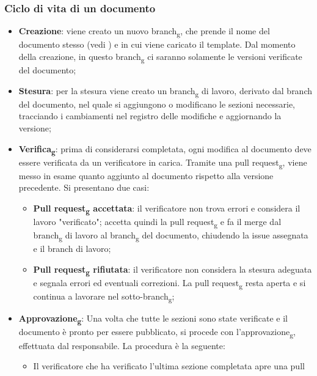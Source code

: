 \subsubsection{Ciclo di vita di un documento}
\begin{itemize}
      \item \textbf{Creazione}: viene creato un nuovo branch\textsubscript{g}, che prende il nome del documento stesso
            (vedi ) e in cui viene caricato il template. Dal momento della creazione, in questo
            branch\textsubscript{g} ci saranno solamente le versioni verificate del documento;
      \item \textbf{Stesura}: per la stesura viene creato un branch\textsubscript{g} di lavoro, derivato dal branch del documento, nel quale si aggiungono o modificano le
            sezioni necessarie, tracciando i cambiamenti nel registro delle modifiche e aggiornando la versione;
      \item \textbf{Verifica\textsubscript{g}}: prima di considerarsi completata, ogni modifica al documento deve essere verificata da un verificatore in carica.
            Tramite una pull request\textsubscript{g}, viene messo in esame quanto aggiunto al documento rispetto alla versione precedente. Si presentano due casi:
            \begin{itemize}
                  \item \textbf{Pull request\textsubscript{g} accettata}: il verificatore non trova errori e considera il lavoro "verificato";
                        accetta quindi la pull request\textsubscript{g} e fa il merge dal branch\textsubscript{g} di lavoro al branch\textsubscript{g} del documento, chiudendo la issue assegnata e il branch di lavoro;
                  \item \textbf{Pull request\textsubscript{g} rifiutata}: il verificatore non considera la stesura adeguata e segnala errori
                        ed eventuali correzioni. La pull request\textsubscript{g} resta aperta e si continua a lavorare nel sotto-branch\textsubscript{g};
            \end{itemize}
      \item \textbf{Approvazione\textsubscript{g}}: Una volta che tutte le sezioni sono state verificate e il documento è pronto per essere pubblicato,
            si procede con l'approvazione\textsubscript{g}, effettuata dal responsabile. La procedura è la seguente:
            \begin{itemize}
                  \item Il verificatore che ha verificato l'ultima sezione completata apre una pull

\end{itemize}
\end{itemize}
